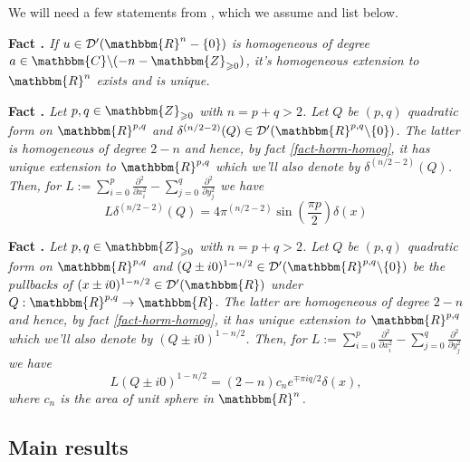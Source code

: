 \documentclass{article}
\newcommand{\assign}{:=}
\newcommand{\tmtextbf}[1]{{\bfseries{#1}}}
\newcommand{\tmtextit}[1]{{\itshape{#1}}}
\newcommand{\tmtextup}[1]{{\upshape{#1}}}
\numberwithin{definition}{section}
\numberwithin{lemma}{section}
\numberwithin{proposition}{section}
{\theorembodyfont{\rmfamily}\newtheorem{remark}{Remark}
\numberwithin{remark}{section}
}
\begin{document}
We will need a few statements from {\cite{hormander1983analysis}}, which we
assume and list below.

{\noindent}\tmtextbf{Fact \tmtextup{9}.
}\tmtextit{\label{fact-horm-homog}{\cite[Thm. 3.2.3]{hormander1983analysis}}
If $u \in \mathcal{D}' ( \mathbbm{R}^n - \{ 0 \})$ is homogeneous of degree $a
\in \mathbbm{C}\backslash ( - n -\mathbbm{Z}_{\geqslant 0})$, it's homogeneous
extension to $\mathbbm{R}^n$ exists and is unique.}{\hspace*{\fill}}{\medskip}

{\noindent}\tmtextbf{Fact \tmtextup{10}.
}\tmtextit{\label{fact-horm1}{\cite[Thm. 6.2.1]{hormander1983analysis}} Let
$p, q \in \mathbbm{Z}_{\geqslant 0}$ with $n = p + q > 2$. Let $Q$ be $( p,
q)$ quadratic form on $\mathbbm{R}^{p, q}$ and $\delta^{( n / 2 - 2)} ( Q) \in
\mathcal{D}' ( \mathbbm{R}^{p, q} \backslash \{ 0 \})$. The latter is
homogeneous of degree $2 - n$ and hence, by fact \ref{fact-horm-homog}, it has
unique extension to $\mathbbm{R}^{p, q}$ which we'll also denote by $\delta^{(
n / 2 - 2)} ( Q)$. Then, for $L \assign \sum_{i = 0}^p
\frac{\partial^2}{\partial x_i^2} - \sum_{j = 0}^q \frac{\partial^2}{\partial
y_j^2}$ we have
\[ L \delta^{( n / 2 - 2)} ( Q) = 4 \pi^{( n / 2 - 2)} \sin \left( \frac{\pi
   p}{2} \right) \delta ( x) \]}{\hspace*{\fill}}{\medskip}

{\noindent}\tmtextbf{Fact \tmtextup{11}.
}\tmtextit{\label{fact-horm2}{\cite[Thm. 6.2.1]{hormander1983analysis}} Let
$p, q \in \mathbbm{Z}_{\geqslant 0}$ with $n = p + q > 2$. Let $Q$ be $( p,
q)$ quadratic form on $\mathbbm{R}^{p, q}$ and $( Q \pm i 0)^{1 - n / 2} \in
\mathcal{D}' ( \mathbbm{R}^{p, q} \backslash \{ 0 \})$ be the pullbacks of $(
x \pm i 0)^{1 - n / 2} \in \mathcal{D}' ( \mathbbm{R})$ under $Q :
\mathbbm{R}^{p, q} \rightarrow \mathbbm{R}$. The latter are homogeneous of
degree $2 - n$ and hence, by fact \ref{fact-horm-homog}, it has unique
extension to $\mathbbm{R}^{p, q}$ which we'll also denote by $( Q \pm i 0)^{1
- n / 2}$. Then, for $L \assign \sum_{i = 0}^p \frac{\partial^2}{\partial
x_i^2} - \sum_{j = 0}^q \frac{\partial^2}{\partial y_j^2}$ we have
\[ L ( Q \pm i 0)^{1 - n / 2} = ( 2 - n) c_n e^{\mp \pi i q / 2} \delta ( x),
\]
where $c_n$ is the area of unit sphere in
$\mathbbm{R}^n$.}{\hspace*{\fill}}{\medskip}

\subsection{Main results}
\end{document}
